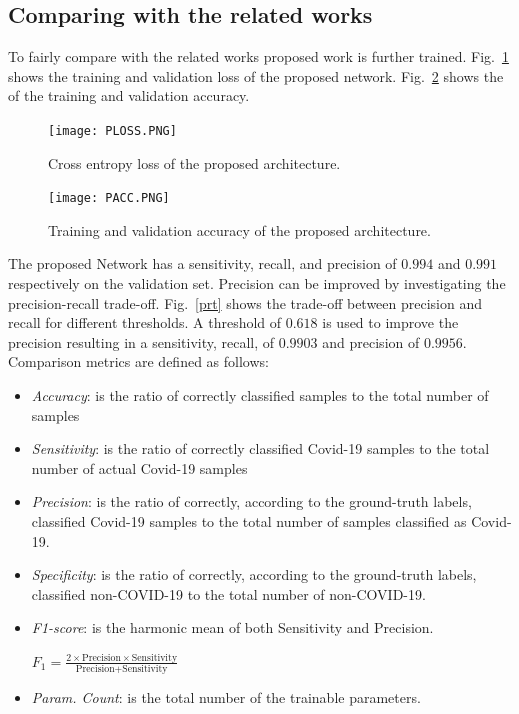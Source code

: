 \subsection{Comparing with the related works}
To fairly compare with the related works proposed work is further trained. Fig.~\ref{ploss} shows the training and validation loss of the proposed network. Fig.~\ref{pacc} shows the of the training and validation accuracy. 
\begin{center}
\begin{figure}[htbp]
\centerline{\texttt{[image: PLOSS.PNG]}}
\caption{Cross entropy loss of the proposed architecture.}
\label{ploss}
\end{figure}
\end{center}
\begin{center}
\begin{figure}[htbp]
\centerline{\texttt{[image: PACC.PNG]}}
\caption{Training and validation accuracy of the proposed architecture.}
\label{pacc}
\end{figure}
\end{center}
The proposed Network has a sensitivity, recall, and precision of $0.994$ and $0.991$ respectively on the validation set. Precision can be improved by investigating the precision-recall trade-off. Fig.~\ref{prt} shows the trade-off between precision and recall for different thresholds. A threshold of $0.618$ is used to improve the precision resulting in a sensitivity, recall, of $0.9903$ and precision of $0.9956$.
Comparison metrics are defined as follows:
\begin{itemize}
\item \textit{Accuracy}: is the ratio of correctly classified samples to the total number of samples
\item \textit{Sensitivity}: is the ratio of correctly classified Covid-19 samples to the total number of actual Covid-19 samples 
\item \textit{Precision}: is the ratio of correctly, according to the ground-truth labels, classified Covid-19 samples to the total number of samples classified as Covid-19.
\item \textit{Specificity}: is the ratio of correctly, according to the ground-truth labels, classified non-COVID-19 to the total number of non-COVID-19.
\item \textit{F1-score}: is the harmonic mean of both Sensitivity and Precision.
\begin{center}  
 $F_{1}=\frac{2\times\text{Precision} \times \text{Sensitivity}}{\text{Precision} + \text{Sensitivity}}$
\end{center}
\item \textit{Param. Count}: is the total number of the trainable parameters.
\end{itemize}


